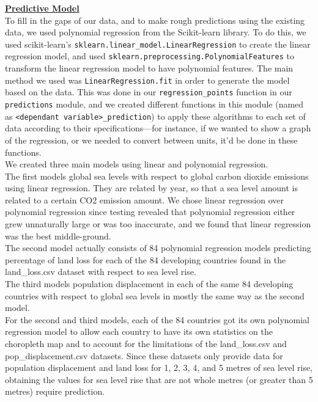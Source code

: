 \documentclass[fontsize=11pt]{article}
\begin{document}
\underline{\textbf{Predictive Model}}\\

To fill in the gaps of our data, and to make rough predictions using the existing data, we used polynomial regression from the Scikit-learn library. To do this, we used scikit-learn’s \texttt{sklearn.linear\_model.LinearRegression} to create the linear regression model, and used \texttt{sklearn.preprocessing.PolynomialFeatures} to transform the linear regression model to have polynomial features. The main method we used was \texttt{LinearRegression.fit} in order to generate the model based on the data. This was done in our \texttt{regression\_points} function in our \texttt{predictions} module, and we created different functions in this module (named as \texttt{<dependant variable>\_prediction}) to apply these algorithms to each set of data according to their specifications---for instance, if we wanted to show a graph of the regression, or we needed to convert between units, it’d be done in these functions.\\

We created three main models using linear and polynomial regression. \\

The first models global sea levels with respect to global carbon dioxide emissions using linear regression. They are related by year, so that a sea level amount is related to a certain CO2 emission amount. We chose linear regression over polynomial regression since testing revealed that polynomial regression either grew unnaturally large or was too inaccurate, and we found that linear regression was the best middle-ground. \\

The second model actually consists of 84 polynomial regression models predicting percentage of land loss for each of the 84 developing countries found in the land\_loss.csv dataset with respect to sea level rise. \\

The third models population displacement in each of the same 84 developing countries with respect to global sea levels in mostly the same way as the second model.\\

For the second and third models, each of the 84 countries got its own polynomial regression model to allow each country to have its own statistics on the choropleth map and to account for the limitations of the land\_loss.csv and pop\_displacement.csv datasets. Since these datasets only provide data for population displacement and land loss for 1, 2, 3, 4, and 5 metres of sea level rise, obtaining the values for sea level rise that are not whole metres (or greater than 5 metres) require prediction.\\
\end{document}

